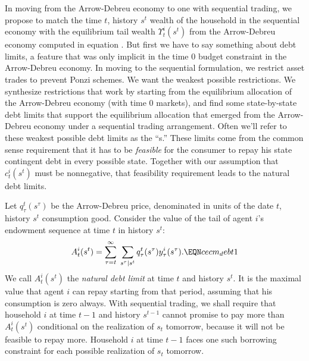 In moving from  the Arrow-Debreu economy to one with sequential
trading, we propose to  match  the time $t$, history $s^{t}$ wealth of
the household  in the sequential economy with the equilibrium  tail wealth
$\Upsilon^i_t(s^t)$ from the Arrow-Debreu economy computed in equation
. But first we have to say something about debt
limits, a feature that was only implicit in the time $0$ budget constraint  in the Arrow-Debreu economy.
In moving to the sequential formulation, we    restrict asset trades to prevent Ponzi schemes.  We
want the weakest possible restrictions.  We
synthesize restrictions that work by starting from the equilibrium
allocation of the Arrow-Debreu economy (with time $0$ markets), and
find some state-by-state debt limits that support
the equilibrium allocation that emerged from the Arrow-Debreu economy under a sequential trading arrangement.
 Often we'll refer to these weakest possible
debt limits as the ``s.'' These limits come
from the common sense requirement that it has to be {\it
feasible\/} for the consumer to repay his state contingent debt in
every possible state.
Together with  our assumption that $c_t^i(s^t)$ must be nonnegative, that
feasibility requirement leads to the natural debt limits.




Let $q_\tau^t(s^\tau)$ be the Arrow-Debreu price, denominated  in
units of the date $t$, history
 $s^t$  consumption good.
Consider the value of the tail of  agent $i$'s endowment sequence
at time $t$ in history $s^t$:
$$ A^i_t(s^t) =
   \sum_{\tau=t}^\infty \; \sum_{s^\tau \vert s^t}
    q^t_\tau(s^\tau) y_\tau^i(s^\tau).   \EQN cecm_debt1$$
 We call
$A^i_t(s^t)$ the {\it natural debt limit} at time $t$ and history
$s^t$. It is the  maximal value that agent $i$   can
repay starting from that period, assuming that his consumption is
zero always.
With sequential trading, we shall require that household $i$ at time $t-1$ and
history $s^{t-1}$ cannot promise to pay more than $A^i_t(s^t)$
conditional on the realization of $s_t$ tomorrow, because it will
not be feasible to repay more. Household $i$ at
time $t-1$ faces one such borrowing constraint for each possible
realization of $s_t$  tomorrow.


